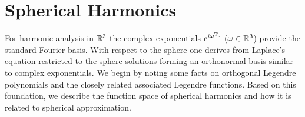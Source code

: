 


\section{Spherical Harmonics}
\label{Basics:SphericalHarmonics}

For harmonic analysis in $\mathbb{R}^3$ the complex exponentials $e^{i \mathbf{\omega}^{\text{\rm{T}}} \cdot}$ 
($\mathbf{\omega} \in \mathbb{R}^3$) provide the standard Fourier basis. With respect to the sphere one derives
from Laplace's equation restricted to the sphere solutions forming an orthonormal basis similar to
complex exponentials. We begin by noting some facts on 
orthogonal Legendre polynomials and the closely related associated
Legendre functions. Based on this
foundation, we describe the function space of spherical harmonics
and how it is related to spherical approximation.

